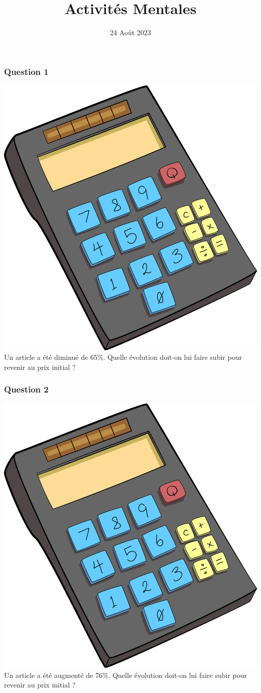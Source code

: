 \documentclass[15pt, mathserif]{beamer}
\title{Activités Mentales}
\date{24 Août 2023}
\begin{document}
\begin{frame}
    \titlepage
\end{frame}

\begin{frame} 
	\frametitle{Question 1}
 \includegraphics[scale=0.01]{calculatrice} Un article a été diminué de 65\%. Quelle évolution doit-on lui faire subir pour revenir au prix initial ? \end{frame}


\begin{frame} 
	\frametitle{Question 2}
 \includegraphics[scale=0.01]{calculatrice} Un article a été augmenté de 76\%. Quelle évolution doit-on lui faire subir pour revenir au prix initial ? \end{frame}
\end{document}
